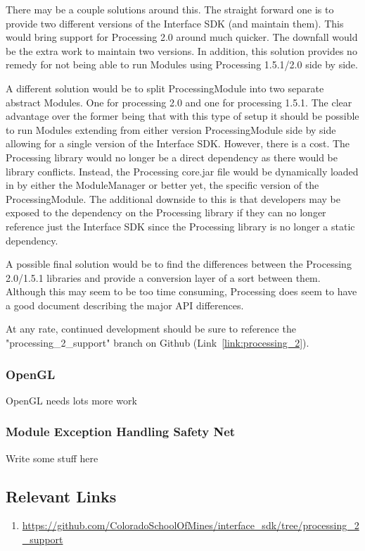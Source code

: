 \documentclass[11pt,letterpaper]{article}
\begin{document}
	There may be a couple solutions around this. The straight forward one is to
	provide two different versions of the Interface SDK (and maintain them). This
	would bring support for Processing 2.0 around much quicker. The downfall would
	be the extra work to maintain two versions. In addition, this solution
	provides no remedy for not being able to run Modules using Processing
	1.5.1/2.0 side by side.

	A different solution would be to split ProcessingModule into two separate
	abstract Modules.  One for processing 2.0 and one for processing 1.5.1.  The
	clear advantage over the former being that with this type of setup it should
	be possible to run Modules extending from either version ProcessingModule side
	by side allowing for a single version of the Interface SDK.  However, there is
	a cost.  The Processing library would no longer be a direct dependency as
	there would be library conflicts.  Instead, the Processing core.jar file would
	be dynamically loaded in by either the ModuleManager or better yet, the
	specific version of the ProcessingModule. The additional downside to this is
	that developers may be exposed to the dependency on the Processing library if
	they can no longer reference just the Interface SDK since the Processing
	library is no longer a static dependency.

	A possible final solution would be to find the differences between the
	Processing 2.0/1.5.1 libraries and provide a conversion layer of a sort
	between them. Although this may seem to be too time consuming, Processing does
	seem to have a good document describing the major API differences.

	At any rate, continued development should be sure to reference the
	"processing\_2\_support" branch on Github (Link~\ref{link:processing_2}).

	\subsubsection{OpenGL} 
	\label{sec:cont_dev_opengl}
	OpenGL needs lots more work

	\subsubsection{Module Exception Handling Safety Net}
	\label{sec:cont_dev_module_exception}
	Write some stuff here

	\pagebreak

	\subsection{Relevant Links}
	\label{sec:relevant_links}

	\begin{enumerate}
		\item
			\url{https://github.com/ColoradoSchoolOfMines/interface\_sdk/tree/processing\_2\_support}
			\label{link:processing_2}
	\end{enumerate}


 
 
\end{document}
